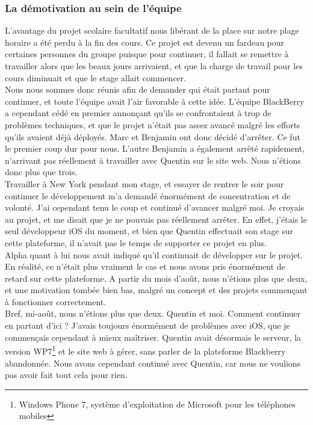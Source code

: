 \documentclass{article}
\begin{document}
		\subsubsection{La démotivation au sein de l'équipe}
		L'avantage du projet scolaire facultatif nous libérant de la place sur notre plage horaire a été perdu à la fin des cours. Ce projet est devenu un fardeau pour certaines personnes du groupe puisque pour continuer, il fallait se remettre à travailler alors que les beaux jours arrivaient, et que la charge de travail pour les cours diminuait et que le stage allait commencer. \\
		
		Nous nous sommes donc réunis afin de demander qui était partant pour continuer, et toute l'équipe avait l'air favorable à cette idée. L'équipe BlackBerry a cependant cédé en premier annonçant qu'ils se confrontaient à trop de problèmes techniques, et que le projet n'était pas assez avancé malgré les efforts qu'ils avaient déjà déployés. Marc et Benjamin ont donc décidé d'arrêter. Ce fut le premier coup dur pour nous. L'autre Benjamin a également arrêté rapidement, n'arrivant pas réellement à travailler avec Quentin sur le site web. Nous n'étions donc plus que trois. \\
		
		Travailler à New York pendant mon stage, et essayer de rentrer le soir pour continuer le développement m'a demandé énormément de concentration et de volonté. J'ai cependant tenu le coup et continué d'avancer malgré moi. Je croyais au projet, et me disait que je ne pouvais pas réellement arrêter. En effet, j'étais le seul développeur iOS du moment, et bien que Quentin effectuait son stage sur cette plateforme, il n'avait pas le temps de supporter ce projet en plus. \\
	
		Alpha quant  à lui nous avait indiqué qu'il continuait de développer sur le projet. En réalité, ce n'était plus vraiment le cas et nous avons pris énormément de retard sur cette plateforme. A partir du mois d'août, nous n'étions plus que deux, et une motivation tombée bien bas, malgré un concept et des projets commençant à fonctionner correctement. \\
	
		Bref, mi-août, nous n'étions plus que deux. Quentin et moi. Comment continuer en partant d'ici ? J'avais toujours énormément de problèmes avec iOS, que je commençais cependant à mieux maîtriser. Quentin avait désormais le serveur, la version WP7\footnote{Windows Phone 7, système d'exploitation de Microsoft pour les téléphones mobiles} et le site web à gérer, sans parler de la plateforme Blackberry abandonnée. Nous avons cependant continué avec Quentin, car nous ne voulions pas avoir fait tout cela pour rien.\\
		
\end{document}

